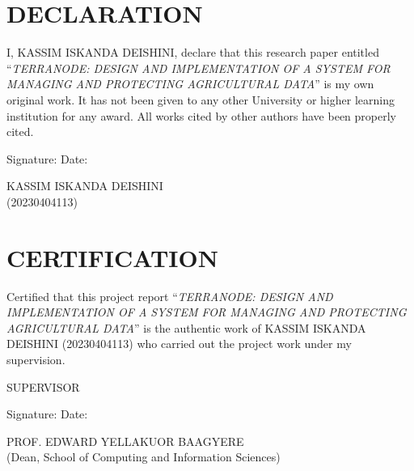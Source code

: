 \documentclass[12pt,a4paper]{report}
\begin{document}
\setcounter{page}{2}

\chapter*{DECLARATION}

\doublespacing

I, KASSIM ISKANDA DEISHINI, declare that this research paper entitled ``\textit{TERRANODE: DESIGN AND IMPLEMENTATION OF A SYSTEM FOR MANAGING AND PROTECTING AGRICULTURAL DATA}'' is my own original work. It has not been given to any other University or higher learning institution for any award. All works cited by other authors have been properly cited.

\vspace{2cm}

\noindent
Signature: \makebox[2in]{\dotfill} \hspace{1cm} Date: \makebox[2in]{\dotfill}

\vspace{0.6cm}

\noindent
KASSIM ISKANDA DEISHINI\\
(20230404113)

\newpage
\chapter*{CERTIFICATION}

\onehalfspacing

Certified that this project report ``\textit{TERRANODE: DESIGN AND IMPLEMENTATION OF A SYSTEM FOR MANAGING AND PROTECTING AGRICULTURAL DATA}'' is the authentic work of KASSIM ISKANDA DEISHINI (20230404113) who carried out the project work under my supervision.

\vspace{1.2cm}

\noindent
SUPERVISOR

\vspace{0.6cm}

\noindent
Signature: \makebox[2in]{\dotfill} \hspace{1cm} Date: \makebox[2in]{\dotfill}

\vspace{0.3cm}

\noindent
PROF. EDWARD YELLAKUOR BAAGYERE\\
(Dean, School of Computing and Information Sciences)
\end{document}
